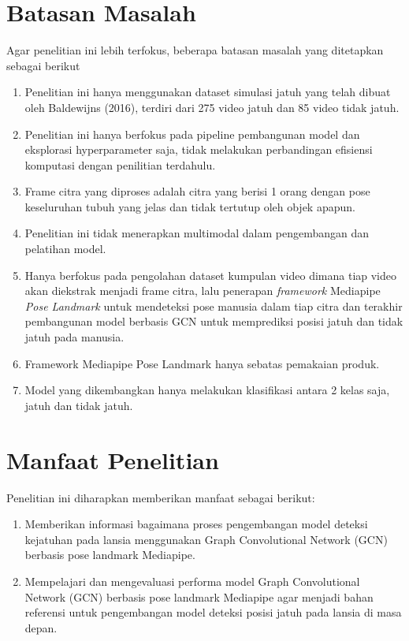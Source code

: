 \section{Batasan Masalah} \label{I.Batasan}
Agar penelitian ini lebih terfokus, beberapa batasan masalah yang ditetapkan sebagai berikut
\begin{enumerate}[noitemsep]
    \item Penelitian ini hanya menggunakan dataset simulasi jatuh yang telah dibuat oleh Baldewijns (2016), terdiri dari 275 video jatuh dan 85 video tidak jatuh.
    \item Penelitian ini hanya berfokus pada pipeline pembangunan model dan eksplorasi hyperparameter  saja, tidak melakukan perbandingan efisiensi komputasi dengan penilitian terdahulu.
    \item Frame citra yang diproses adalah citra yang berisi 1 orang dengan pose keseluruhan tubuh yang jelas dan tidak tertutup oleh objek apapun.
    \item Penelitian ini tidak menerapkan multimodal dalam pengembangan dan pelatihan model.
    \item Hanya berfokus pada pengolahan dataset kumpulan video dimana tiap video akan diekstrak menjadi frame citra, lalu penerapan \textit{framework} Mediapipe \textit{Pose Landmark} untuk mendeteksi pose manusia dalam tiap citra dan terakhir pembangunan model berbasis GCN untuk memprediksi posisi jatuh dan tidak jatuh pada manusia.
    \item Framework Mediapipe Pose Landmark hanya sebatas pemakaian produk.
    \item Model yang dikembangkan hanya melakukan klasifikasi antara 2 kelas saja, jatuh dan tidak jatuh.
\end{enumerate}

\section{Manfaat Penelitian} \label{I.Manfaat}
Penelitian ini diharapkan memberikan manfaat sebagai berikut:
\begin{enumerate}[noitemsep]
    \item Memberikan informasi bagaimana proses pengembangan model deteksi kejatuhan pada lansia menggunakan Graph Convolutional Network (GCN) berbasis pose landmark Mediapipe.
    \item Mempelajari dan mengevaluasi performa model Graph Convolutional Network (GCN) berbasis pose landmark Mediapipe agar menjadi bahan referensi untuk pengembangan model deteksi posisi jatuh pada lansia di masa depan.
\end{enumerate}

